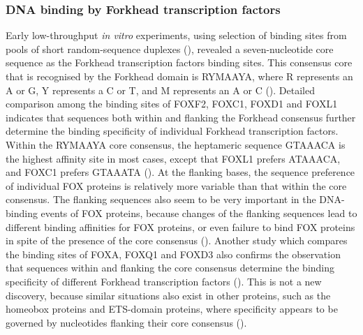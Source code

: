 \subsubsection{DNA binding by Forkhead transcription factors}

Early low-throughput \textit{in vitro} experiments, using selection of binding sites from pools of short random-sequence duplexes (\cite{pierrou1995selection}), revealed a seven-nucleotide core sequence as the Forkhead transcription factors binding sites. This consensus core that is recognised by the Forkhead domain is RYMAAYA, where R represents an A or G, Y represents a C or T, and M represents an A or C (\cite{kaufmann1995dna,overdier1994the,pierrou1994cloning}). Detailed comparison among the binding sites of FOXF2, FOXC1, FOXD1 and FOXL1 indicates that sequences both within and flanking the Forkhead consensus further determine the binding specificity of individual Forkhead transcription factors. Within the RYMAAYA core consensus, the heptameric sequence GTAAACA is the highest affinity site in most cases, except that FOXL1 prefers ATAAACA, and FOXC1 prefers GTAAATA (\cite{pierrou1994cloning}). At the flanking bases, the sequence preference of individual FOX proteins is relatively more variable than that within the core consensus. The flanking sequences also seem to be very important in the DNA-binding events of FOX proteins, because changes of the flanking sequences lead to different binding affinities for FOX proteins, or even failure to bind FOX proteins in spite of the presence of the core consensus (\cite{pierrou1994cloning}). Another study which compares the binding sites of FOXA, FOXQ1 and FOXD3 also confirms the observation that sequences within and flanking the core consensus determine the binding specificity of different Forkhead transcription factors (\cite{overdier1994the}). This is not a new discovery, because similar situations also exist in other proteins, such as the homeobox proteins and ETS-domain proteins, where specificity appears to be governed by nucleotides flanking their core consensus (\cite{ekker1991optimal,ekker1992differential,catron1993nucleotides,szymczyna2000dna}).

